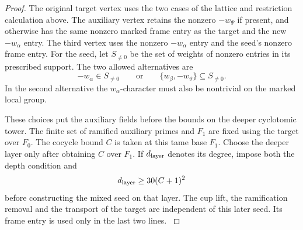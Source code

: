 \begin{proof}
The original target vertex uses the two cases of the
lattice and restriction calculation above. The auxiliary
vertex retains the nonzero \(-w_\Psi\) if present,
and otherwise has the same nonzero marked frame entry
as the target and the new \(-w_\alpha\) entry. The
third vertex uses the nonzero \(-w_\alpha\) entry and
the seed's nonzero frame entry. For the seed, let \(S_{\ne0}\) be the set of weights of nonzero entries in its prescribed support. The two allowed alternatives are
\[
 -w_\alpha\in S_{\ne0}\qquad\text{or}\qquad \{w_\beta,-w_\vartheta\}\subseteq S_{\ne0}.
\]
In the second alternative the \(w_\alpha\)-character must also be nontrivial on the marked local group.

These choices put the auxiliary fields before the
bounds on the deeper cyclotomic tower. The finite
set of ramified auxiliary primes and \(F_1\) are fixed
using the target over \(F_0\). The cocycle bound \(C\)
is taken at this tame base \(F_1\). Choose the deeper layer only after obtaining \(C\) over \(F_1\). If \(d_{\rm layer}\) denotes its degree, impose both the depth condition and
\[
 d_{\rm layer}\ge30(C+1)^2
\]
before constructing the mixed seed on that layer. The cup lift, the ramification removal and the
transport of the target are independent of this later
seed. Its frame entry is used only in the last two lines.
\label{cor:cohomology-count-two-chain-4}
\end{proof}
